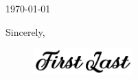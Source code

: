 \documentclass{article}
\begin{document}
\makeheader
\makefooter


\mainfont\fontsize{9pt}{9pt}\selectfont

\linespread{1.5} 
\setlength{\parskip}{4pt}

\vspace{1.75em}

 \today
 
 \vspace{1.75em}

 


\vspace{4em}

Sincerely,
\begin{figure}[h]
	\includegraphics[height=1cm]{../fig/sign.png}
	\vspace*{-10pt}
\end{figure}

\mynamePhD
\end{document}
